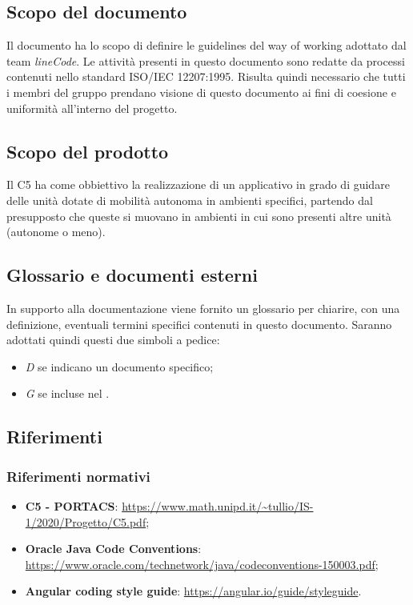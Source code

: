 \subsection{Scopo del documento}
Il documento ha lo scopo di definire le guidelines del way of working adottato dal team \textit{lineCode}. Le attività presenti in questo documento sono redatte da processi contenuti nello standard ISO/IEC 12207:1995. Risulta quindi necessario che tutti i membri del gruppo prendano visione di questo documento ai fini di coesione e uniformità all'interno del progetto.

\subsection{Scopo del prodotto}
Il  C5 ha come obbiettivo la realizzazione di un applicativo  in grado di guidare delle unità dotate di mobilità autonoma in ambienti specifici, partendo dal presupposto che queste si muovano in ambienti in cui sono presenti altre unità (autonome o meno).

\subsection{Glossario e documenti esterni}
In supporto alla documentazione viene fornito un glossario per chiarire, con una definizione, eventuali termini specifici contenuti in questo documento.
Saranno adottati quindi questi due simboli a pedice:
\begin{itemize}
	\item \textit{D} se indicano un documento specifico;
	\item \textit{G} se incluse nel .
\end{itemize}

\subsection{Riferimenti}
	\subsubsection{Riferimenti normativi}
	\begin{itemize}
		\item \textbf{{C5 - PORTACS}}: \url{https://www.math.unipd.it/~tullio/IS-1/2020/Progetto/C5.pdf};
        \item \textbf{Oracle Java Code Conventions}: \url{https://www.oracle.com/technetwork/java/codeconventions-150003.pdf};
        \item \textbf{Angular coding style guide}: \url{https://angular.io/guide/styleguide}.
	\end{itemize}
